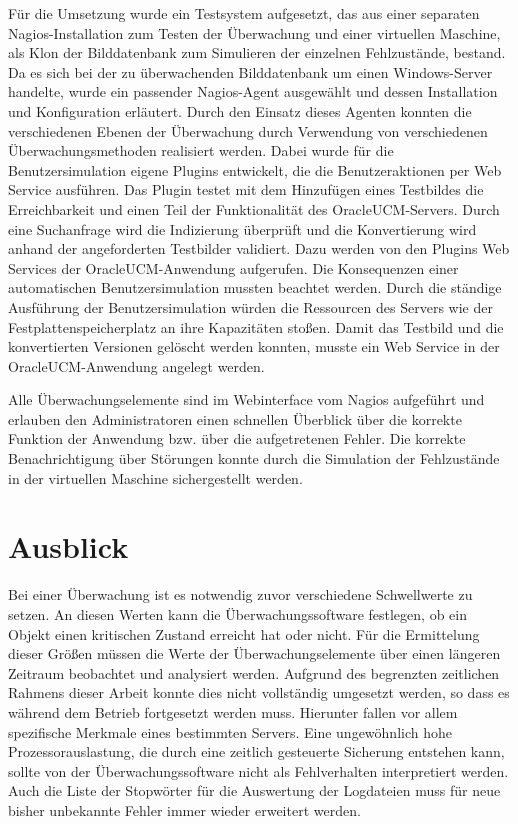 Für die Umsetzung wurde ein Testsystem aufgesetzt, das aus einer separaten Nagios-Installation zum Testen der Überwachung und einer virtuellen Maschine, als Klon der Bilddatenbank zum Simulieren der einzelnen Fehlzustände, bestand.
Da es sich bei der zu überwachenden Bilddatenbank um einen Windows-Server handelte, wurde ein passender Nagios-Agent ausgewählt und dessen Installation und Konfiguration erläutert.
Durch den Einsatz dieses Agenten konnten die verschiedenen Ebenen der Überwachung durch Verwendung von verschiedenen Überwachungsmethoden realisiert werden.
Dabei wurde für die Benutzersimulation eigene Plugins entwickelt, die die Benutzeraktionen per Web Service ausführen.
Das Plugin testet mit dem Hinzufügen eines Testbildes die Erreichbarkeit und einen Teil der Funktionalität des \gls{OracleUCM}-Servers.
Durch eine Suchanfrage wird die Indizierung überprüft und die Konvertierung wird anhand der angeforderten Testbilder validiert.
Dazu werden von den Plugins Web Services der \gls{OracleUCM}-Anwendung aufgerufen.
Die Konsequenzen einer automatischen Benutzersimulation mussten beachtet werden.
Durch die ständige Ausführung der Benutzersimulation würden die Ressourcen des Servers wie der Festplattenspeicherplatz an ihre Kapazitäten stoßen.
Damit das Testbild und die konvertierten Versionen gelöscht werden konnten, musste ein Web Service in der \gls{OracleUCM}-Anwendung angelegt werden.

Alle Überwachungselemente sind im Webinterface vom Nagios aufgeführt und erlauben den Administratoren einen schnellen Überblick über die korrekte Funktion der Anwendung bzw. über die aufgetretenen Fehler.
Die korrekte Benachrichtigung über Störungen konnte durch die Simulation der Fehlzustände in der virtuellen Maschine sichergestellt werden.
\newpage
\section{Ausblick}
Bei einer Überwachung ist es notwendig zuvor verschiedene Schwellwerte zu setzen.
An diesen Werten kann die Überwachungssoftware festlegen, ob ein Objekt einen kritischen Zustand erreicht hat oder nicht.
Für die Ermittelung dieser Größen müssen die Werte der Überwachungselemente über einen längeren Zeitraum beobachtet und analysiert werden.
Aufgrund des begrenzten zeitlichen Rahmens dieser Arbeit konnte dies nicht vollständig umgesetzt werden, so dass es während dem Betrieb fortgesetzt werden muss.
Hierunter fallen vor allem spezifische Merkmale eines bestimmten Servers.
Eine ungewöhnlich hohe Prozessorauslastung, die durch eine zeitlich gesteuerte Sicherung entstehen kann, sollte von der Überwachungssoftware nicht als Fehlverhalten interpretiert werden.
Auch die Liste der Stopwörter für die Auswertung der Logdateien muss für neue bisher unbekannte Fehler immer wieder erweitert werden.

